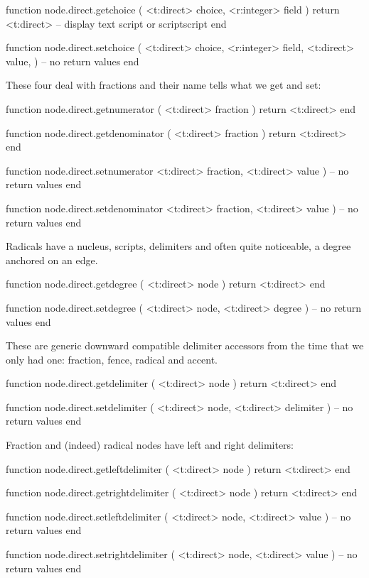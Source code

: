 \starttyping[option=LUA]
function node.direct.getchoice (
    <t:direct>  choice,
    <r:integer> field
)
    return <t:direct> -- display text script or scriptscript
end

function node.direct.setchoice (
    <t:direct>  choice,
    <r:integer> field,
    <t:direct>  value,
)
    -- no return values
end
\stoptyping

These four deal with fractions and their name tells what we get and set:

\starttyping[option=LUA]
function node.direct.getnumerator ( <t:direct> fraction )
    return <t:direct>
end

function node.direct.getdenominator ( <t:direct> fraction )
    return <t:direct>
end

function node.direct.setnumerator
    <t:direct> fraction,
    <t:direct> value
)
    -- no return values
end

function node.direct.setdenominator
    <t:direct> fraction,
    <t:direct> value
)
    -- no return values
end
\stoptyping

Radicals have a nucleus, scripts, delimiters and often quite noticeable, a degree anchored
on an edge.

\starttyping[option=LUA]
function node.direct.getdegree ( <t:direct> node )
    return <t:direct>
end

function node.direct.setdegree ( <t:direct> node, <t:direct> degree )
    -- no return values
end
\stoptyping

These are generic downward compatible delimiter accessors from the time that we
only had one: fraction, fence, radical and accent.

\starttyping[option=LUA]
function node.direct.getdelimiter ( <t:direct> node )
    return <t:direct>
end

function node.direct.setdelimiter ( <t:direct> node, <t:direct> delimiter )
    -- no return values
end
\stoptyping

Fraction and (indeed) radical nodes have left and right delimiters:

\starttyping[option=LUA]
function node.direct.getleftdelimiter ( <t:direct> node )
    return <t:direct>
end

function node.direct.getrightdelimiter ( <t:direct> node )
    return <t:direct>
end

function node.direct.setleftdelimiter (
    <t:direct> node,
    <t:direct> value
)
    -- no return values
end

function node.direct.setrightdelimiter (
    <t:direct> node,
    <t:direct> value
)
    -- no return values
end
\stoptyping


